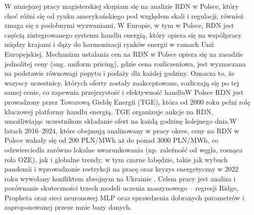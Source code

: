 W niniejszej pracy magisterskiej skupiam się na analizie RDN w Polsce, który choć różni się od rynku amerykańskiego pod względem skali i regulacji, również zmaga się z podobnymi wyzwaniami. W Europie, w tym w Polsce, RDN jest częścią zintegrowanego systemu handlu energią, który opiera się na współpracy między krajami i dąży do harmonizacji rynków energii w ramach Unii Europejskiej. Mechanizm ustalania cen na RDN w Polsce opiera się na zasadzie jednolitej ceny (ang. uniform pricing), gdzie cena rozliczeniowa, jest wyznaczana na podstawie równowagi popytu i podaży dla każdej godziny. Oznacza to, że wszyscy uczestnicy, których oferty zostały zaakceptowane, rozliczają się po tej samej cenie, co zapewnia przejrzystość i efektywność handluW Polsce RDN jest prowadzony przez Towarową Giełdę Energii (TGE), która od 2000 roku pełni rolę kluczowej platformy handlu energią. TGE organizuje aukcje na RDN, umożliwiając uczestnikom składanie ofert na każdą godzinę kolejnego dnia.W latach 2016–2024, które obejmują analizowany w pracy okres, ceny na RDN w Polsce wahały się od 200 PLN/MWh aż do ponad 3000 PLN/MWh, co odzwierciedla zarówno lokalne uwarunkowania (np. zależność od węgla, rosnąca rola OZE), jak i globalne trendy, w tym czarne łabędzie, takie jak wybuch pandemii i wprowadzonie restrykcji na pracę oraz kryzys energetyczny w 2022 roku wywołany konfliktem zbrojnym na Ukrainie . Celem pracy jest analiza i porównanie skuteczności trzech modeli uczenia maszynowego – regresji Ridge, Propheta oraz sieci neuronowej MLP oraz sprawdzenia dobranych parametrów i zaproponowanej przeze mnie bazy danych.  